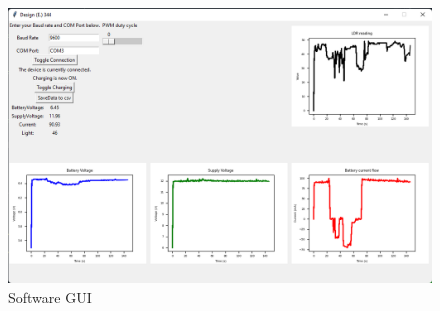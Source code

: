 \begin{figure}[!htb]
	\centering
	\includegraphics[width=1\linewidth]{Figures/A9/GUI.png}
	\caption{Software GUI}
	\label{fig:GUI}
\end{figure}